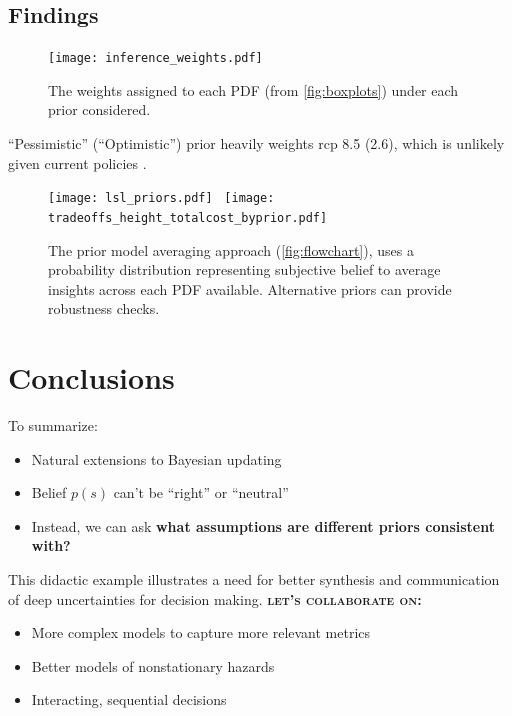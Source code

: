 \documentclass[12pt]{article}
\begin{document}
\subsection{Findings}

\begin{figure}
    \centering
    \texttt{[image: inference\_weights.pdf]}
    \caption{
        The weights assigned to each PDF (from \cref{fig:boxplots}) under each prior considered.
    }
\end{figure}
``Pessimistic'' (``Optimistic'') prior heavily weights \gls{rcp} 8.5 (2.6), which is unlikely given current policies \citep{hausfather_scenarios:2020}.

\begin{figure}
    \centering
    \texttt{[image: lsl\_priors.pdf]}~
    \texttt{[image: tradeoffs\_height\_totalcost\_byprior.pdf]}
    \caption{
        The prior model averaging approach (\cref{fig:flowchart}), uses a probability distribution representing subjective belief to average insights across each PDF available.
        Alternative priors can provide robustness checks.
    }
\end{figure}

\section{Conclusions}\label{sec:conclusions}

To summarize:
\begin{itemize}
    \item Natural extensions to Bayesian updating
    \item Belief $p(s)$ can't be ``right''  \citep{gelman_workflow:2020,gelman_philosophy:2013} or ``neutral'' \citep{quinn_exploratory:2020}
    \item Instead, we can ask \textbf{what assumptions are different priors consistent with?}
\end{itemize}

This didactic example illustrates a need for better synthesis and communication of deep uncertainties for decision making.
\textbf{\scshape let's collaborate on:}
\begin{itemize}
    \item More complex models to capture more relevant metrics
    \item Better models of nonstationary hazards
    \item Interacting, sequential decisions
\end{itemize}
\end{document}
